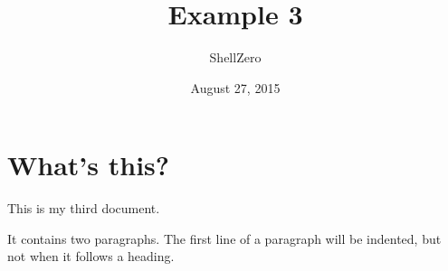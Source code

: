 \documentclass[a4paper,11pt]{article}
\begin{document}
\title{Example 3}
\author{ShellZero}
\date{August 27, 2015}
\maketitle
\section{What's this?}
This          is   my
third document.

It contains two paragraphs. The first line of a paragraph will be
indented, but not when it follows a heading.
\end{document}
